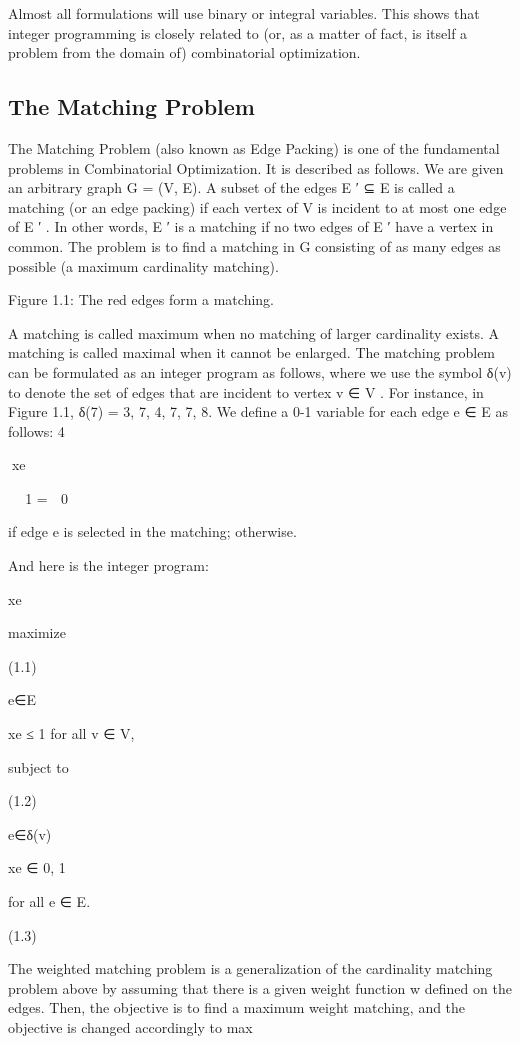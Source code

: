 \documentclass[titlepage]{book}
\begin{document}
Almost all formulations will use binary or integral variables. This shows that integer programming
is closely related to (or, as a matter of fact, is itself a problem from the domain of) combinatorial
optimization.

\subsection{The Matching Problem}

The Matching Problem (also known as Edge Packing) is one of the fundamental problems in Combinatorial
Optimization. It is described as follows. We are given an arbitrary graph G = (V, E). A subset of the
edges E ′ ⊆ E is called a matching (or an edge packing) if each vertex of V is incident to at most one edge
of E ′ . In other words, E ′ is a matching if no two edges of E ′ have a vertex in common. The problem is
to find a matching in G consisting of as many edges as possible (a maximum cardinality matching).

Figure 1.1: The red edges form a matching.

A matching is called maximum when no matching of larger cardinality exists. A matching is called
maximal when it cannot be enlarged.
The matching problem can be formulated as an integer program as follows, where we use the symbol
δ(v) to denote the set of edges that are incident to vertex v ∈ V . For instance, in Figure 1.1, δ(7) =
{{3, 7}, {4, 7}, {7, 8}}. We define a 0-1 variable for each edge e ∈ E as follows:
4

xe


 1
=
 0

if edge e is selected in the matching;
otherwise.

And here is the integer program:

xe

maximize

(1.1)

e∈E

xe ≤ 1 for all v ∈ V,

subject to

(1.2)

e∈δ(v)

xe ∈ {0, 1}

for all e ∈ E.

(1.3)

The weighted matching problem is a generalization of the cardinality matching problem above by assuming that there is a given weight function w defined on the edges. Then, the objective is to find a
maximum weight matching, and the objective is changed accordingly to max
\end{document}
